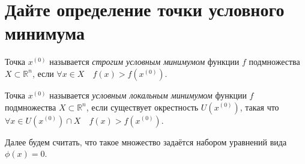 \documentclass{article}
\begin{document}
\section{Дайте определение точки условного минимума}
\begin{definition}
    Точка $x^{(0)}$ называется \textit{строгим условным минимумом} функции $f$ подмножества $X \subset \mathbb{R}^n$, если $\forall x \in X \quad f(x) > f(x^{(0)})$.
\end{definition}
\begin{definition}
    Точка $x^{(0)}$ называется \textit{условным локальным минимумом} функции $f$ подмножества $X \subset \mathbb{R}^n$, если существует окрестность $U(x^{(0)})$, такая что $\forall x \in U(x^{(0)}) \cap X \quad f(x) > f(x^{(0)})$.
\end{definition}
\begin{remark}
Далее будем считать, что такое множество задаётся набором уравнений вида $\phi(x)=0$.
\end{remark}
\end{document}
